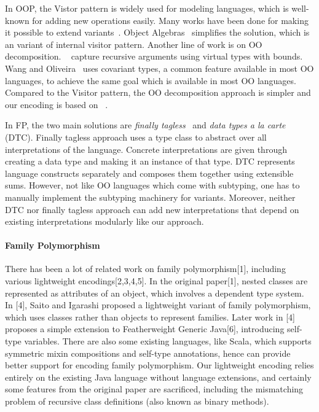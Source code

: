 In OOP, the Vistor pattern is widely used for modeling languages, which is
well-known for adding new operations easily. Many works
have been done for making it possible to extend variants~\cite{oliveira07genericity,oliveira09modular}.
Object Algebras~\cite{bruno12oa} simplifies the solution, which is an variant of
internal visitor pattern.
Another line of work is on OO decomposition. ~\cite{zenger} capture recursive
arguments using virtual types with bounds. Wang and Oliveira~\cite{eptrivially16}
uses covariant types, a common feature available in most OO languages, to achieve the same goal which is available in most OO languages.
Compared to the Visitor pattern, the OO decomposition approach is simpler and our encoding is based on ~\cite{eptrivially16}.

In FP, the two main solutions are \emph{finally
  tagless}~\cite{carette2009finally} and \emph{data types a la
  carte}~\cite{swierstra2008data} (DTC).
Finally tagless approach uses a type class to abstract over all interpretations
of the language. Concrete interpretations are given through creating a data type and
making it an instance of that type.
DTC represents language constructs separately and composes them together using
extensible sums. However, not like OO languages which come with subtyping, one
has to manually implement the subtyping machinery for variants.
Moreover, neither DTC nor finally tagless approach can add new interpretations
that depend on existing interpretations modularly like our approach.

\paragraph{Family Polymorphism}

There has been a lot of related work on family polymorphism[1], including various lightweight encodings[2,3,4,5]. In the original
paper[1], nested classes are represented as attributes of an object, which involves a dependent type system. In [4], Saito and Igarashi
proposed a lightweight variant of family polymorphism, which uses classes rather than objects to represent families. Later work in [4]
proposes a simple extension to Featherweight Generic Java[6], introducing self-type variables. There are also some existing languages,
like Scala, which supports symmetric mixin compositions and self-type annotations, hence can provide better support for encoding family
polymorphism. Our lightweight encoding relies entirely on the existing Java language without language extensions, and certainly some features from
the original paper are sacrificed, including the mismatching problem of recursive class definitions (also known as binary methods).


